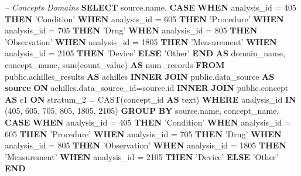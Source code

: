 \documentclass[]{book}
\newenvironment{Shaded}{\begin{snugshade}}{\end{snugshade}}
\newcommand{\KeywordTok}[1]{\textcolor[rgb]{0.13,0.29,0.53}{\textbf{#1}}}
\newcommand{\DecValTok}[1]{\textcolor[rgb]{0.00,0.00,0.81}{#1}}
\newcommand{\StringTok}[1]{\textcolor[rgb]{0.31,0.60,0.02}{#1}}
\newcommand{\CommentTok}[1]{\textcolor[rgb]{0.56,0.35,0.01}{\textit{#1}}}
\newcommand{\FunctionTok}[1]{\textcolor[rgb]{0.00,0.00,0.00}{#1}}
\newcommand{\NormalTok}[1]{#1}
\begin{document}
\begin{Shaded}
\begin{Highlighting}[]
\CommentTok{-- Concepts Domains}
\KeywordTok{SELECT}\NormalTok{ source.name,}
    \KeywordTok{CASE} \KeywordTok{WHEN}\NormalTok{ analysis_id = }\DecValTok{405} \KeywordTok{THEN} \StringTok{'Condition'}
    \KeywordTok{WHEN}\NormalTok{ analysis_id = }\DecValTok{605} \KeywordTok{THEN} \StringTok{'Procedure'}
    \KeywordTok{WHEN}\NormalTok{ analysis_id = }\DecValTok{705} \KeywordTok{THEN} \StringTok{'Drug'}
    \KeywordTok{WHEN}\NormalTok{ analysis_id = }\DecValTok{805} \KeywordTok{THEN} \StringTok{'Observation'}
    \KeywordTok{WHEN}\NormalTok{ analysis_id = }\DecValTok{1805} \KeywordTok{THEN} \StringTok{'Measurement'}
    \KeywordTok{WHEN}\NormalTok{ analysis_id = }\DecValTok{2105} \KeywordTok{THEN} \StringTok{'Device'}
    \KeywordTok{ELSE} \StringTok{'Other'} \KeywordTok{END} \KeywordTok{AS}\NormalTok{ domain_name,}
\NormalTok{    concept_name, }\FunctionTok{sum}\NormalTok{(count_value) }\KeywordTok{AS}\NormalTok{ num_records}
\KeywordTok{FROM}\NormalTok{ public.achilles_results }\KeywordTok{AS}\NormalTok{ achilles }\KeywordTok{INNER} \KeywordTok{JOIN} 
\NormalTok{    public.data_source }\KeywordTok{AS} \KeywordTok{source} \KeywordTok{ON}\NormalTok{ achilles.data_source_id=source.id}
\KeywordTok{INNER} \KeywordTok{JOIN}\NormalTok{ public.concept }\KeywordTok{AS}\NormalTok{ c1 }\KeywordTok{ON}\NormalTok{ stratum_2 = }\FunctionTok{CAST}\NormalTok{(concept_id }\KeywordTok{AS} 
\NormalTok{    text)}
\KeywordTok{WHERE}\NormalTok{ analysis_id }\KeywordTok{IN}\NormalTok{ (}\DecValTok{405}\NormalTok{, }\DecValTok{605}\NormalTok{, }\DecValTok{705}\NormalTok{, }\DecValTok{805}\NormalTok{, }\DecValTok{1805}\NormalTok{, }\DecValTok{2105}\NormalTok{)}
\KeywordTok{GROUP} \KeywordTok{BY}\NormalTok{ source.name, concept_name, }
    \KeywordTok{CASE} \KeywordTok{WHEN}\NormalTok{ analysis_id = }\DecValTok{405} \KeywordTok{THEN} \StringTok{'Condition'}
    \KeywordTok{WHEN}\NormalTok{ analysis_id = }\DecValTok{605} \KeywordTok{THEN} \StringTok{'Procedure'}
    \KeywordTok{WHEN}\NormalTok{ analysis_id = }\DecValTok{705} \KeywordTok{THEN} \StringTok{'Drug'}
    \KeywordTok{WHEN}\NormalTok{ analysis_id = }\DecValTok{805} \KeywordTok{THEN} \StringTok{'Observation'}
    \KeywordTok{WHEN}\NormalTok{ analysis_id = }\DecValTok{1805} \KeywordTok{THEN} \StringTok{'Measurement'}
    \KeywordTok{WHEN}\NormalTok{ analysis_id = }\DecValTok{2105} \KeywordTok{THEN} \StringTok{'Device'}
    \KeywordTok{ELSE} \StringTok{'Other'} \KeywordTok{END}
\end{Highlighting}
\end{Shaded}
\end{document}
